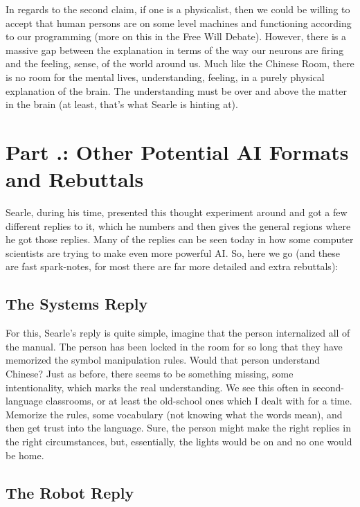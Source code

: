 In regards to the second claim, if one is a physicalist, then we could be willing to accept that human persons are on some level machines and functioning according to our programming (more on this in the Free Will Debate). However, there is a massive gap between the explanation in terms of the way our neurons are firing and the feeling, sense, of the world around us. Much like the Chinese Room, there is no room for the mental lives, understanding, feeling, in a purely physical explanation of the brain. The understanding must be over and above the matter in the brain (at least, that's what Searle is hinting at). 

\section{Part \thechapcount.\theseccount: Other Potential AI Formats and Rebuttals}

Searle, during his time, presented this thought experiment around and got a few different replies to it, which he numbers and then gives the general regions where he got those replies. Many of the replies can be seen today in how some computer scientists are trying to make even more powerful AI.  So, here we go (and these are fast spark-notes, for most there are far more detailed and extra rebuttals):
\subsection{The Systems Reply}

    For this,  Searle's reply is quite simple, imagine that the person internalized all of the manual. The person has been locked in the room for so long that they have memorized the symbol manipulation rules. Would that person understand Chinese? Just as before, there seems to be something missing, some intentionality, which marks the real understanding. We see this often in second-language classrooms, or at least the old-school ones which I dealt with for a time. Memorize the rules, some vocabulary  (not knowing what the words mean), and then get trust into the language. Sure, the person might make the right replies in the right circumstances, but, essentially, the lights would be on and no one would be home.
    
\subsection{The Robot Reply}

